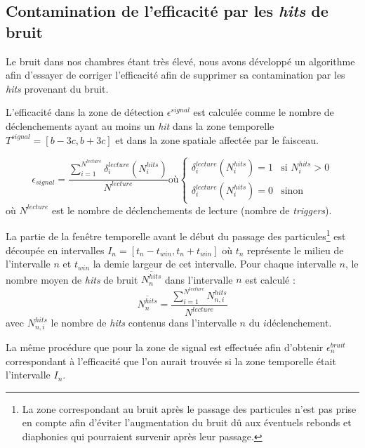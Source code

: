 \subsection{Contamination de l'efficacité par les \textit{hits} de bruit}

Le bruit dans nos chambres étant très élevé, nous avons développé un algorithme afin d'essayer de corriger l'efficacité afin de supprimer sa contamination par les \textit{hits} provenant du bruit.

L'efficacité dans la zone de détection $\epsilon^{signal}$ est calculée comme le nombre de déclenchements ayant au moins un \textit{hit} dans la zone temporelle $T^{signal}=\left[b-3c,b+3c\right]$ et dans la zone spatiale affectée par le faisceau.

\begin{equation}
\epsilon_{signal}=\frac{\sum\limits_{i=1}^{N^{lecture}} \delta^{lecture}_i(N^{hits}_{i})}{N^{lecture}} \mbox{où}
\left\{
\begin{array}{ll}
\delta^{lecture}_i(N^{hits}_{i})=1 & \mbox{si } N^{hits}_{i}>0 \\
\delta^{lecture}_i(N^{hits}_{i})=0 & \mbox{sinon}
\end{array}
\right.
\end{equation}
où $N^{lecture}$ est le nombre de déclenchements de lecture (nombre de \textit{triggers}).

La partie de la fenêtre temporelle avant le début du passage des particules\footnote{La zone correspondant au bruit après le passage des particules n'est pas prise en compte afin d'éviter l'augmentation du bruit dû aux éventuels rebonds et diaphonies qui pourraient survenir après leur passage.} est découpée en intervalles $I_{n}=\left[t_{n}-t_{win},t_{n}+t_{win}\right]$ où $t_{n}$ représente le milieu de l'intervalle $n$ et $t_{win}$ la demie largeur de cet intervalle. Pour chaque intervalle $n$, le nombre moyen de \textit{hits} de bruit $\overline{N^{hits}_n}$ dans l'intervalle $n$ est calculé :
\begin{equation}
\overline{N^{hits}_n}=\frac{\sum\limits_{i=1}^{N^{lecture}} N^{hits}_{n,i}}{N^{lecture}}
\end{equation}
avec $N^{hits}_{n,i}$ le nombre de \textit{hits} contenus dans l'intervalle $n$ du $i$\ieme déclenchement.

La même procédure que pour la zone de signal est effectuée afin d'obtenir $\epsilon^{bruit}_n$ correspondant à l'efficacité que l'on aurait trouvée si la zone temporelle était l'intervalle $I_{n}$.

